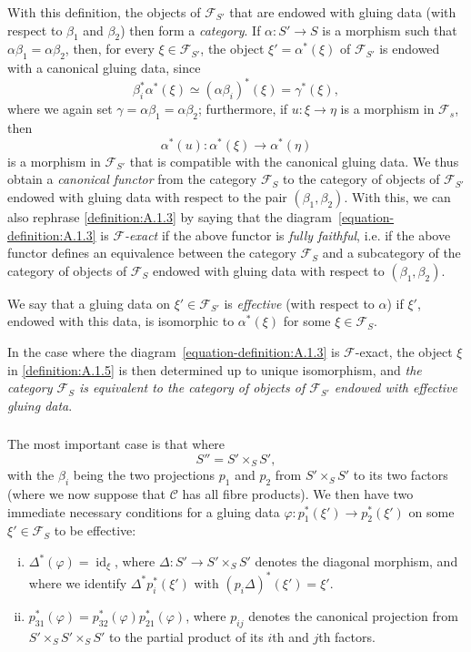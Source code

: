 \documentclass{article}
\theoremstyle{plain}
\theoremstyle{definition}
\newenvironment{definition}[1]
  {\renewcommand\theinnercustomdefinition{#1}\innercustomdefinition}
  {\endinnercustomdefinition}
\newcommand{\sh}[1]{{\mathscr{#1}}}
\newcommand{\cat}[1]{{\mathcal{#1}}}
\DeclareMathOperator{\id}{id}
\newcommand{\oldpage}[1]{\marginpar{\footnotesize$\Big\vert$ \textit{p.~#1}}}
\begin{document}
With this definition, the objects of $\sh{F}_{S'}$ that are endowed with gluing data (with respect to $\beta_1$ and $\beta_2$) then form a \emph{category}.
If $\alpha\colon S'\to S$ is a morphism such that $\alpha\beta_1=\alpha\beta_2$, then, for every $\xi\in\sh{F}_{S'}$, the object $\xi'=\alpha^*(\xi)$
\oldpage{190-04}
of $\sh{F}_{S'}$ is endowed with a canonical gluing data, since
\[
  \beta_i^*\alpha^*(\xi)
  \simeq (\alpha\beta_i)^*(\xi)
  = \gamma^*(\xi),
\]
where we again set $\gamma=\alpha\beta_1=\alpha\beta_2$;
furthermore, if $u\colon\xi\to\eta$ is a morphism in $\sh{F}_s$, then
\[
  \alpha^*(u)\colon \alpha^*(\xi) \to \alpha^*(\eta)
\]
is a morphism in $\sh{F}_{S'}$ that is compatible with the canonical gluing data.
We thus obtain a \emph{canonical functor} from the category $\sh{F}_S$ to the category of objects of $\sh{F}_{S'}$ endowed with gluing data with respect to the pair $(\beta_1,\beta_2)$.
With this, we can also rephrase \cref{definition:A.1.3} by saying that the diagram~\cref{equation-definition:A.1.3} is \emph{$\sh{F}$-exact} if the above functor is \emph{fully faithful}, i.e. if the above functor defines an equivalence between the category $\sh{F}_S$ and a subcategory of the category of objects of $\sh{F}_S$ endowed with gluing data with respect to $(\beta_1,\beta_2)$.

\begin{definition}{1.5}
\label{definition:A.1.5}
  We say that a gluing data on $\xi'\in\sh{F}_{S'}$ is \emph{effective} (with respect to $\alpha$) if $\xi'$, endowed with this data, is isomorphic to $\alpha^*(\xi)$ for some $\xi\in\sh{F}_S$.
\end{definition}

In the case where the diagram~\cref{equation-definition:A.1.3} is $\sh{F}$-exact, the object $\xi$ in \cref{definition:A.1.5} is then determined up to unique isomorphism, and \emph{the category $\sh{F}_S$ is equivalent to the category of objects of $\sh{F}_{S'}$ endowed with effective gluing data}.


\subsubsection{}
\label{A.1.c}
The most important case is that where
\[
  S'' = S' \times_S S',
\]
with the $\beta_i$ being the two projections $p_1$ and $p_2$ from $S'\times_S S'$ to its two factors (where we now suppose that $\cat{C}$ has all fibre products).
We then have two immediate necessary conditions for a gluing data $\varphi\colon p_1^*(\xi')\to p_2^*(\xi')$ on some $\xi'\in\sh{F}_S$ to be effective:
\begin{enumerate}[(i)]
  \item $\Delta^*(\varphi) = \id_\xi$, where $\Delta\colon S'\to S'\times_S S'$ denotes the diagonal morphism, and where we identify $\Delta^* p_i^*(\xi')$ with $(p_i\Delta)^*(\xi')=\xi'$.
  \item $p_{31}^*(\varphi) = p_{32}^*(\varphi)p_{21}^*(\varphi)$,
\oldpage{190-05}
  where $p_{ij}$ denotes the canonical projection from $S'\times_S S'\times_S S'$ to the partial product of its $i$th and $j$th factors.
\end{enumerate}
\end{document}
